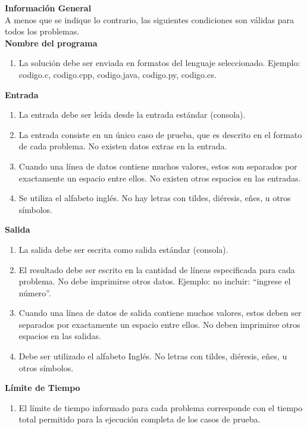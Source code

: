 \clearpage\thispagestyle{empty}

{\Large \textbf{Información General}}\\
A menos que se indique lo contrario, las siguientes condiciones son válidas para todos los problemas.\\

\textbf{Nombre del programa}
\begin{enumerate}
    \item La solución debe ser enviada en formatos del lenguaje seleccionado. Ejemplo: codigo.c, codigo.cpp, codigo.java, codigo.py, codigo.cs.
\end{enumerate}

\textbf{Entrada}
\begin{enumerate}
    \item La entrada debe ser leída desde la entrada estándar (consola).
    \item La entrada consiste en un único caso de prueba, que es descrito en el formato de cada problema. No existen datos extras en la entrada.
    \item Cuando una línea de datos contiene muchos valores, estos son separados por exactamente un espacio entre ellos. No existen otros espacios en las entradas.
    \item Se utiliza el alfabeto inglés. No hay letras con tildes, diéresis, eñes, u otros símbolos.
\end{enumerate}

\textbf{Salida}
\begin{enumerate}
    \item La salida debe ser escrita como salida estándar (consola).
    \item El resultado debe ser escrito en la cantidad de líneas especificada para cada problema. No debe imprimirse otros datos. Ejemplo: no incluir: ``ingrese el número''.
    \item Cuando una línea de datos de salida contiene muchos valores, estos deben ser separados por exactamente un espacio entre ellos. No deben imprimirse otros espacios en las salidas.
    \item Debe ser utilizado el alfabeto Inglés. No letras con tildes, diéresis, eñes, u otros símbolos.
\end{enumerate}

\textbf{Límite de Tiempo}
\begin{enumerate}
    \item El límite de tiempo informado para cada problema corresponde con el tiempo total permitido para la ejecución completa de los casos de prueba.
\end{enumerate}

